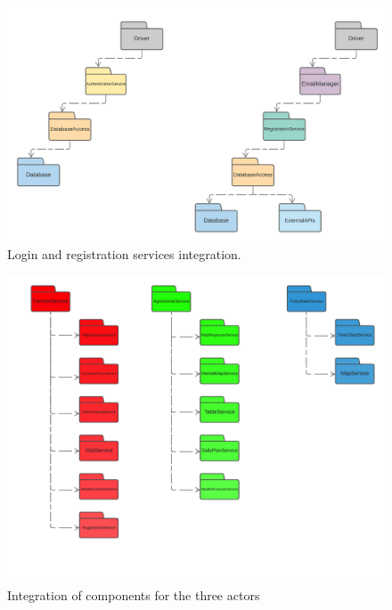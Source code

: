 \begin{center}
    \begin{figure}[h!]
  \centering
  \centerline{
  \includegraphics[scale=0.65]{./Images/IntegrationStrategy/IT2.png}}
  \caption{Login and registration services integration.}
\end{figure}
\end{center}


\begin{center}
    \begin{figure}[h!]
  \centering
  \centerline{
  \includegraphics[scale=0.15]{./Images/IntegrationStrategy/IT3-mod.png}}
  \caption{Integration of components for the three actors}
\end{figure}
\end{center}



